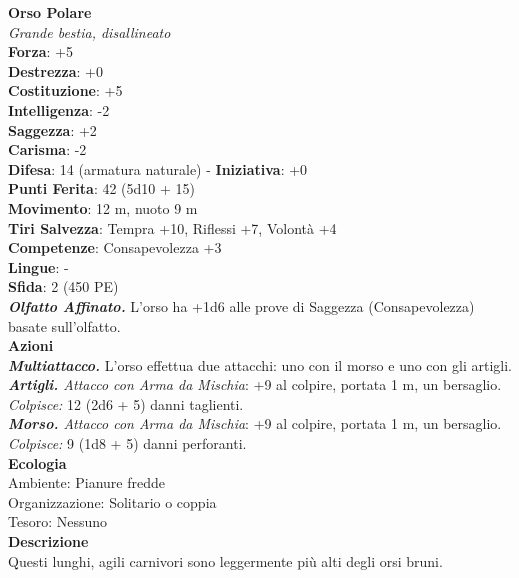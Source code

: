 \begin{multicols}{2}
\medskip\textbf{Orso Polare}\\
\emph{Grande bestia, disallineato}\\
\textbf{Forza}: +5\\
\textbf{Destrezza}: +0\\
\textbf{Costituzione}: +5\\
\textbf{Intelligenza}: -2\\
\textbf{Saggezza}: +2\\
\textbf{Carisma}: -2\\
\textbf{Difesa}: 14 (armatura naturale) - \textbf{Iniziativa}: +0\\
\textbf{Punti Ferita}: 42 (5d10 + 15)\\
\textbf{Movimento}: 12 m, nuoto 9 m\\
\textbf{Tiri Salvezza}: Tempra +10, Riflessi +7, Volontà +4 \\
\textbf{Competenze}: Consapevolezza +3\\
\textbf{Lingue}: -\\
\textbf{Sfida}: 2 (450 PE)\smallskip\\
\emph{\textbf{Olfatto Affinato.}} L'orso ha +1d6 alle prove di Saggezza (Consapevolezza) basate sull'olfatto.\\
\smallskip\textbf{Azioni}\\
\emph{\textbf{Multiattacco.}} L'orso effettua due attacchi: uno con il morso e uno con gli artigli.\\
\emph{\textbf{Artigli.} Attacco con Arma da Mischia}: +9 al colpire, portata 1 m, un bersaglio.\\
\emph{Colpisce:} 12 (2d6 + 5) danni taglienti.\\
\emph{\textbf{Morso.} Attacco con Arma da Mischia}: +9 al colpire, portata 1 m, un bersaglio.\\
\emph{Colpisce:} 9 (1d8 + 5) danni perforanti.\\
\textbf{Ecologia}\\
Ambiente: Pianure fredde\\
Organizzazione: Solitario o coppia\\
Tesoro: Nessuno\\
\textbf{Descrizione}\\

Questi lunghi, agili carnivori sono leggermente più alti degli orsi bruni. \\


\end{multicols}
